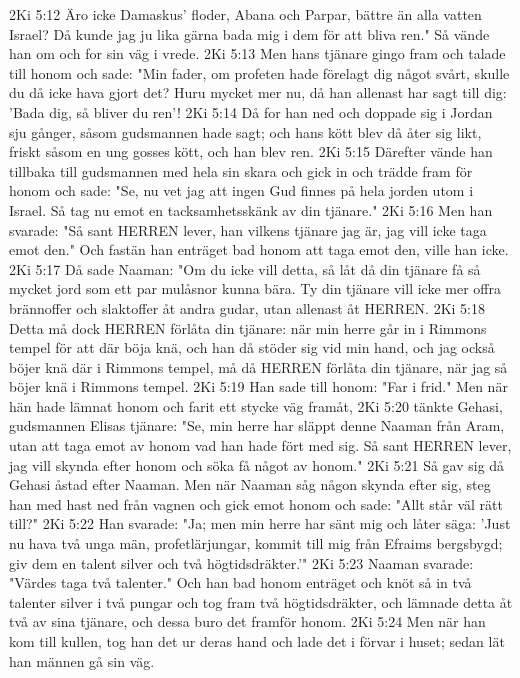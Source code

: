 2Ki 5:12  Äro icke Damaskus' floder, Abana och Parpar, bättre än alla vatten Israel? Då kunde jag ju lika gärna bada mig i dem för att bliva ren." Så vände han om och for sin väg i vrede.
2Ki 5:13  Men hans tjänare gingo fram och talade till honom och sade: "Min fader, om profeten hade förelagt dig något svårt, skulle du då icke hava gjort det? Huru mycket mer nu, då han allenast har sagt till dig: 'Bada dig, så bliver du ren'!
2Ki 5:14  Då for han ned och doppade sig i Jordan sju gånger, såsom gudsmannen hade sagt; och hans kött blev då åter sig likt, friskt såsom en ung gosses kött, och han blev ren.
2Ki 5:15  Därefter vände han tillbaka till gudsmannen med hela sin skara och gick in och trädde fram för honom och sade: "Se, nu vet jag att ingen Gud finnes på hela jorden utom i Israel. Så tag nu emot en tacksamhetsskänk av din tjänare."
2Ki 5:16  Men han svarade: "Så sant HERREN lever, han vilkens tjänare jag är, jag vill icke taga emot den." Och fastän han enträget bad honom att taga emot den, ville han icke.
2Ki 5:17  Då sade Naaman: "Om du icke vill detta, så låt då din tjänare få så mycket jord som ett par mulåsnor kunna bära. Ty din tjänare vill icke mer offra brännoffer och slaktoffer åt andra gudar, utan allenast åt HERREN.
2Ki 5:18  Detta må dock HERREN förlåta din tjänare: när min herre går in i Rimmons tempel för att där böja knä, och han då stöder sig vid min hand, och jag också böjer knä där i Rimmons tempel, må då HERREN förlåta din tjänare, när jag så böjer knä i Rimmons tempel.
2Ki 5:19  Han sade till honom: "Far i frid." Men när hän hade lämnat honom och farit ett stycke väg framåt,
2Ki 5:20  tänkte Gehasi, gudsmannen Elisas tjänare: "Se, min herre har släppt denne Naaman från Aram, utan att taga emot av honom vad han hade fört med sig. Så sant HERREN lever, jag vill skynda efter honom och söka få något av honom."
2Ki 5:21  Så gav sig då Gehasi åstad efter Naaman. Men när Naaman såg någon skynda efter sig, steg han med hast ned från vagnen och gick emot honom och sade: "Allt står väl rätt till?"
2Ki 5:22  Han svarade: "Ja; men min herre har sänt mig och låter säga: 'Just nu hava två unga män, profetlärjungar, kommit till mig från Efraims bergsbygd; giv dem en talent silver och två högtidsdräkter.'"
2Ki 5:23  Naaman svarade: "Värdes taga två talenter." Och han bad honom enträget och knöt så in två talenter silver i två pungar och tog fram två högtidsdräkter, och lämnade detta åt två av sina tjänare, och dessa buro det framför honom.
2Ki 5:24  Men när han kom till kullen, tog han det ur deras hand och lade det i förvar i huset; sedan lät han männen gå sin väg.
